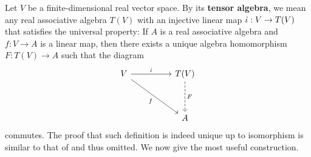 \documentclass{report}
\begin{document}
\begin{mdframed}
Let $V$ be a finite-dimensional real vector space. By its  \textbf{tensor algebra}, we mean any real associative algebra $T(V)$ with an injective linear map $\dot{\iota}:V\rightarrow T(V)$ that satisfies the universal property: If $A$ is a real associative algebra and $f:V\rightarrow A$ is a linear map, then there exists a unique algebra homomorphism $F:T(V)\rightarrow A$ such that the diagram  
\[\begin{tikzcd}
	V && {T(V)} \\
	\\
	&& A
	\arrow["{\dot{\iota}}", from=1-1, to=1-3]
	\arrow["f"', from=1-1, to=3-3]
	\arrow["F", dashed, from=1-3, to=3-3]
\end{tikzcd}\]
commutes. The proof that such definition is indeed unique up to isomorphism is similar to that of  and thus omitted. We now give the most useful construction. \\


\end{mdframed}
\end{document}

